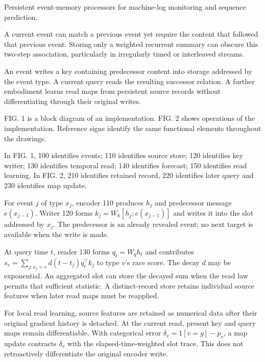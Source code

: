\documentclass[pct]{sm-patent}
\begin{document}
\descriptionstart


\pnum Persistent event-memory processors for machine-log monitoring and sequence prediction.


\pnum A current event can match a previous event yet require the content that followed that previous event. Storing only a weighted recurrent summary can obscure this two-step association, particularly in irregularly timed or interleaved streams.


\pnum An event writes a key containing predecessor content into storage addressed by the event type. A current query reads the resulting successor relation. A further embodiment learns read maps from persistent source records without differentiating through their original writes.


\pnum FIG. 1 is a block diagram of an implementation. FIG. 2 shows operations of the implementation. Reference signs identify the same functional elements throughout the drawings.


\pnum In FIG. 1, 100 identifies events; 110 identifies source store; 120 identifies key writer; 130 identifies temporal read; 140 identifies forecast; 150 identifies read learning. In FIG. 2, 210 identifies retained record, 220 identifies later query and 230 identifies map update.

\pnum For event $j$ of type $x_j$, encoder 110 produces $h_j$ and predecessor message $e(x_{j-1})$. Writer 120 forms $k_j=W_k[h_j;e(x_{j-1})]$ and writes it into the slot addressed by $x_j$. The predecessor is an already revealed event; no next target is available when the write is made.

\pnum At query time $t$, reader 130 forms $q_t=W_qh_t$ and contributes $s_v=\sum_{j:x_j=v}d(t-t_j)q_t^\top k_j$ to type $v$'s race score. The decay $d$ may be exponential. An aggregated slot can store the decayed sum when the read law permits that sufficient statistic. A distinct-record store retains individual source features when later read maps must be reapplied.

\pnum For local read learning, source features are retained as numerical data after their original gradient history is detached. At the current read, present key and query maps remain differentiable. With categorical error $\delta_v=1[v=y]-p_v$, a map update contracts $\delta_v$ with the elapsed-time-weighted slot trace. This does not retroactively differentiate the original encoder write.
\end{document}
